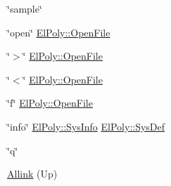 \begin{DoxyItemize}
\item \char`\"{}sample\char`\"{} 
\item \char`\"{}open\char`\"{} \hyperlink{classElPoly_a3432306726a27b310ec27b3900894b11}{\-El\-Poly\-::\-Open\-File} 
\item \char`\"{}$>$\char`\"{} \hyperlink{classElPoly_a3432306726a27b310ec27b3900894b11}{\-El\-Poly\-::\-Open\-File} 
\item \char`\"{}$<$\char`\"{} \hyperlink{classElPoly_a3432306726a27b310ec27b3900894b11}{\-El\-Poly\-::\-Open\-File} 
\item \char`\"{}f\char`\"{} \hyperlink{classElPoly_a3432306726a27b310ec27b3900894b11}{\-El\-Poly\-::\-Open\-File} 
\item \char`\"{}info\char`\"{} \hyperlink{classVarData_a4dd85f1789027793b97a591acc9caf30}{\-El\-Poly\-::\-Sys\-Info} \hyperlink{classVarData_aa415b42b89dfba2ab8189be4e86b41ad}{\-El\-Poly\-::\-Sys\-Def} 
\item \char`\"{}q\char`\"{}


\end{DoxyItemize}


\begin{DoxyItemize}
\item \hyperlink{index}{\-Allink} (\-Up)  
\end{DoxyItemize}